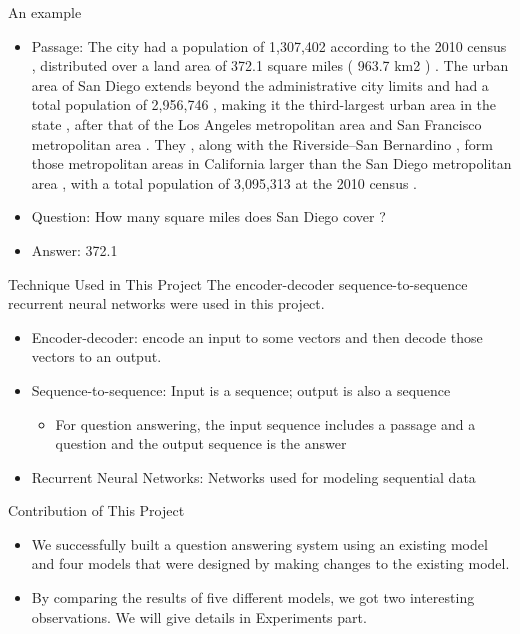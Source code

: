 \documentclass{beamer}
\begin{document}
\begin{frame}{An example}
    \begin{examples}
            \begin{itemize}
                \item Passage: The city had a population of 1,307,402 according to the 2010 census , distributed over a land area of 372.1 square miles ( 963.7 km2 ) . The urban area of San Diego extends beyond the administrative city limits and had a total population of 2,956,746 , making it the third-largest urban area in the state , after that of the Los Angeles metropolitan area and San Francisco metropolitan area . They , along with the Riverside–San Bernardino , form those metropolitan areas in California larger than the San Diego metropolitan area , with a total population of 3,095,313 at the 2010 census .
                \item Question: How many square miles does San Diego cover ?
                \item Answer: 372.1
            \end{itemize}
        \end{examples}
\end{frame}

\begin{frame}{Technique Used in This Project}
The encoder-decoder sequence-to-sequence recurrent neural networks were used in this project.
   \begin{itemize}
       \item Encoder-decoder:  encode an input to some vectors and then decode those vectors to an output.
       \item Sequence-to-sequence: Input is a sequence; output is also a sequence
            \begin{itemize}
                \item For question answering, the input sequence includes a passage and a question and the output sequence is the answer
            \end{itemize}
       \item Recurrent Neural Networks: Networks used for modeling sequential data

   \end{itemize}
\end{frame}

\begin{frame}{Contribution of This Project}
    \begin{itemize}
        \item We successfully built a question answering system using an existing model and four models that were designed by making changes to the existing model.
        \item By comparing the results of five different models, we got two interesting observations. We will give details in Experiments part.
    \end{itemize}
\end{frame}
\end{document}
